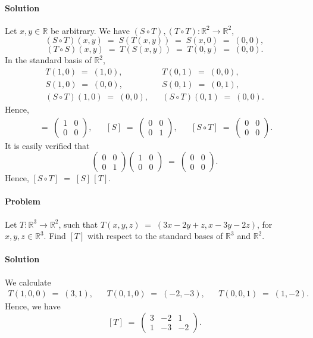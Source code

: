 \documentclass[10pt]{article}
\newcounter{prob}
\def\problem{\stepcounter{prob}\paragraph{Problem \arabic{prob}}}
\def\solution{\paragraph{Solution}}
\begin{document}
        \solution
        Let $x, y \in \mathbb{R}$ be arbitrary. We have $(S\circ T), (T\circ T)\colon \mathbb{R}^2 \to \mathbb{R}^2$,
        \[
        (S \circ T)(x, y) \;=\; S(T(x, y)) \;=\; S(x, 0) \;=\; (0, 0), 
        \]
        \[
        (T \circ S)(x, y) \;=\; T(S(x, y)) \;=\; T(0, y) \;=\; (0, 0).
        \]
        In the standard basis of $\mathbb{R}^2$,
        \begin{align*}
                T(1, 0) \;=\; (1, 0),    && T(0, 1) \;=\; (0, 0), \\
                S(1, 0) \;=\; (0, 0),    && S(0, 1) \;=\; (0, 1), \\
                (S\circ T)(1, 0) \;=\; (0, 0), && (S\circ T)(0, 1) \;=\; (0, 0).
        \end{align*}
        Hence,
        \begin{align*}
                [T] \;=\; \begin{pmatrix} 1 & 0 \\ 0 & 0 \end{pmatrix}, &&
                [S] \;=\; \begin{pmatrix} 0 & 0 \\ 0 & 1 \end{pmatrix}, &&
                [S\circ T] \;=\; \begin{pmatrix} 0 & 0 \\ 0 & 0 \end{pmatrix}.
        \end{align*}
        It is easily verified that
        \[
        \begin{pmatrix} 0 & 0 \\ 0 & 1 \end{pmatrix}\begin{pmatrix} 1 & 0 \\ 0 & 0 \end{pmatrix} \;=\; \begin{pmatrix} 0 & 0 \\ 0 & 0 \end{pmatrix}.
        \]
        Hence, $[S\circ T] \;=\; [S]\, [T]$.

        \problem Let $T\colon \mathbb{R}^3 \to \mathbb{R}^2$, such that $T(x, y, z) \;=\; (3x - 2y + z, x - 3y - 2z)$, for
        $x, y, z \in \mathbb{R}^3$. Find $[T]$ with respect to the standard bases of $\mathbb{R}^3$ and $\mathbb{R}^2$.

        \solution We calculate
        \begin{align*}
        T(1, 0, 0) \;=\; (3, 1), && T(0, 1, 0) \;=\; (-2, -3), && T(0, 0, 1) \;=\; (1, -2).
        \end{align*}
        Hence, we have
        \[
        [T] \;=\; \begin{pmatrix} 3 & -2 & 1 \\ 1 & -3 & -2\end{pmatrix}.
        \]
\end{document}
